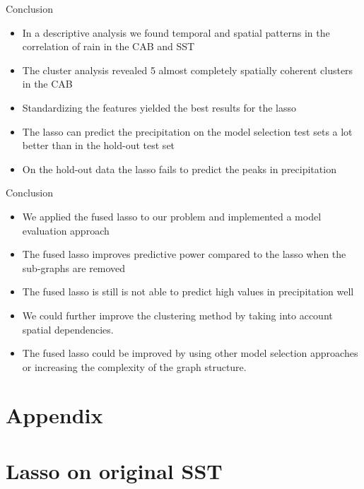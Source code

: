 \documentclass[
  ignorenonframetext,
]{beamer}
\providecommand{\tightlist}{%
  \setlength{\itemsep}{0pt}\setlength{\parskip}{0pt}}
\begin{document}
\begin{frame}{Conclusion}
\protect\hypertarget{conclusion}{}
\begin{itemize}
\tightlist
\item
  In a descriptive analysis we found temporal and spatial patterns in
  the correlation of rain in the CAB and SST
\item
  The cluster analysis revealed 5 almost completely spatially coherent
  clusters in the CAB
\item
  Standardizing the features yielded the best results for the lasso
\item
  The lasso can predict the precipitation on the model selection test
  sets a lot better than in the hold-out test set
\item
  On the hold-out data the lasso fails to predict the peaks in
  precipitation
\end{itemize}
\end{frame}

\begin{frame}{Conclusion}
\protect\hypertarget{conclusion-1}{}
\begin{itemize}
\tightlist
\item
  We applied the fused lasso to our problem and implemented a model
  evaluation approach
\item
  The fused lasso improves predictive power compared to the lasso when
  the sub-graphs are removed
\item
  The fused lasso is still is not able to predict high values in
  precipitation well
\item
  We could further improve the clustering method by taking into account
  spatial dependencies.
\item
  The fused lasso could be improved by using other model selection
  approaches or increasing the complexity of the graph structure.
\end{itemize}
\end{frame}

\hypertarget{appendix}{%
\section{Appendix}\label{appendix}}

\hypertarget{lasso-on-original-sst}{%
\section{Lasso on original SST}\label{lasso-on-original-sst}}
\end{document}
